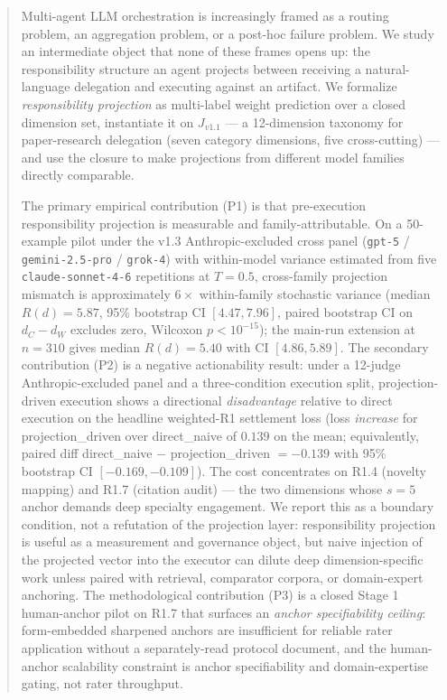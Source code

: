 \begin{abstract}
Multi-agent LLM orchestration is increasingly framed as a routing problem, an aggregation problem, or a post-hoc failure problem. We study an intermediate object that none of these frames opens up: the responsibility structure an agent projects between receiving a natural-language delegation and executing against an artifact. We formalize \emph{responsibility projection} as multi-label weight prediction over a closed dimension set, instantiate it on $J_{v1.1}$ --- a 12-dimension taxonomy for paper-research delegation (seven category dimensions, five cross-cutting) --- and use the closure to make projections from different model families directly comparable.

The primary empirical contribution (P1) is that pre-execution responsibility projection is measurable and family-attributable. On a 50-example pilot under the v1.3 Anthropic-excluded cross panel (\texttt{gpt-5} / \texttt{gemini-2.5-pro} / \texttt{grok-4}) with within-model variance estimated from five \texttt{claude-sonnet-4-6} repetitions at $T = 0.5$, cross-family projection mismatch is approximately $6\times$ within-family stochastic variance (median $R(d) = 5.87$, 95\% bootstrap CI $[4.47, 7.96]$, paired bootstrap CI on $d_C - d_W$ excludes zero, Wilcoxon $p < 10^{-15}$); the main-run extension at $n = 310$ gives median $R(d) = 5.40$ with CI $[4.86, 5.89]$. The secondary contribution (P2) is a negative actionability result: under a 12-judge Anthropic-excluded panel and a three-condition execution split, projection-driven execution shows a directional \emph{disadvantage} relative to direct execution on the headline weighted-R1 settlement loss (loss \emph{increase} for projection\_driven over direct\_naive of $0.139$ on the mean; equivalently, paired diff direct\_naive $-$ projection\_driven $= -0.139$ with 95\% bootstrap CI $[-0.169, -0.109]$). The cost concentrates on R1.4 (novelty mapping) and R1.7 (citation audit) --- the two dimensions whose $s = 5$ anchor demands deep specialty engagement. We report this as a boundary condition, not a refutation of the projection layer: responsibility projection is useful as a measurement and governance object, but naive injection of the projected vector into the executor can dilute deep dimension-specific work unless paired with retrieval, comparator corpora, or domain-expert anchoring. The methodological contribution (P3) is a closed Stage 1 human-anchor pilot on R1.7 that surfaces an \emph{anchor specifiability ceiling}: form-embedded sharpened anchors are insufficient for reliable rater application without a separately-read protocol document, and the human-anchor scalability constraint is anchor specifiability and domain-expertise gating, not rater throughput.


\end{abstract}
